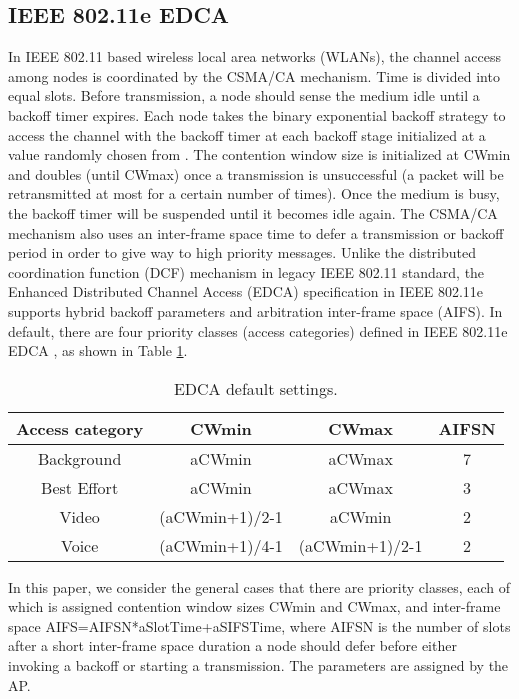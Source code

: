 \documentclass[conference]{IEEEtran}
\begin{document}
\subsection{IEEE 802.11e EDCA}
In IEEE 802.11 based wireless local area networks (WLANs), the channel access among nodes is coordinated by the CSMA/CA mechanism. Time is divided into equal slots. Before transmission, a node should sense the medium idle until a backoff timer expires. Each node takes the binary exponential backoff strategy to access the channel with the backoff timer at each backoff stage initialized at a value randomly chosen from . The contention window size  is initialized at CWmin and doubles (until CWmax) once a transmission is unsuccessful (a packet will be retransmitted at most for a certain number of times). Once the medium is busy, the backoff timer will be suspended until it becomes idle again. The CSMA/CA mechanism also uses an inter-frame space time to defer a transmission or backoff period in order to give way to high priority messages. Unlike the distributed coordination function (DCF) mechanism in legacy IEEE 802.11 standard, the Enhanced Distributed Channel Access (EDCA) specification in IEEE 802.11e supports hybrid backoff parameters and arbitration inter-frame space (AIFS). In default, there are four priority classes (access categories) defined in IEEE 802.11e EDCA \cite{standards2005wireless}, as shown in Table \ref{Table:EDCA}.
\begin{table}[ht]
\centering
\label{Table:EDCA}
\caption{EDCA default settings.}
\begin{tabular}{|c|c|c|c|}
  \hline
    \textbf{Access category}	& \textbf{CWmin}	& \textbf{CWmax}	& \textbf{AIFSN} \\
  \hline
    Background 	& {aCWmin}	& {aCWmax}	& 7 \\
    Best Effort  & {aCWmin} & {aCWmax}	& 3 \\
    Video 	& ({aCWmin}+1)/2-1	& {aCWmin}	& 2 \\
    Voice 	& ({aCWmin}+1)/4-1	& ({aCWmin}+1)/2-1	& 2 \\
  \hline
\end{tabular}
\vspace{-2mm}
\end{table}

In this paper, we consider the general cases that there are  priority classes, each of which is assigned contention window sizes CWmin and CWmax, and inter-frame space AIFS=AIFSN*aSlotTime+aSIFSTime, where AIFSN is the number of slots after a short inter-frame space duration a node should defer before either invoking a backoff or starting a transmission. The parameters are assigned by the AP.
\end{document}
